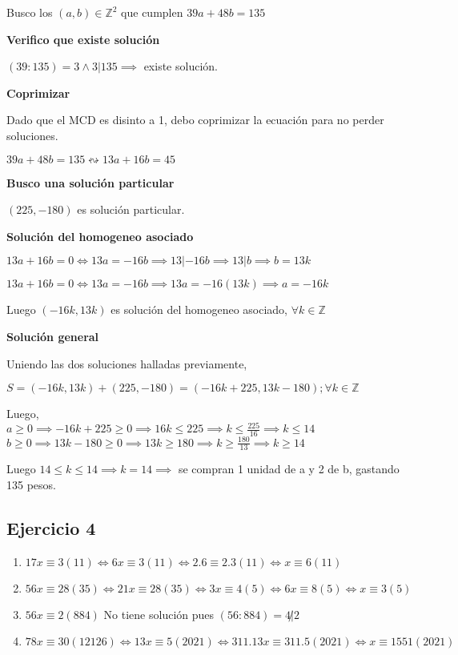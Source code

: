 Busco los $ (a,b) \in \mathbb{Z}^2 $ que cumplen $ 39a+48b=135 $

\textbf{Verifico que existe solución}

$ (39:135) = 3 \wedge 3|135 \implies $ existe solución.

\textbf{Coprimizar}

Dado que el MCD es disinto a 1, debo coprimizar la ecuación para no perder soluciones.

$ 39a+48b=135 \leftrightsquigarrow 13a+16b=45$

\textbf{Busco una solución particular}

$ (225,-180) $ es solución particular.

\textbf{Solución del homogeneo asociado}

$ 13a +16b = 0 \iff 13a = -16b \implies 13|-16b \implies 13|b \implies b=13k $

$ 13a +16b = 0 \iff 13a = -16b \implies 13a = -16(13k) \implies a = -16k $

Luego $ (-16k,13k) $ es solución del homogeneo asociado, $ \forall k \in \mathbb{Z} $

\textbf{Solución general}

Uniendo las dos soluciones halladas previamente,

$ S = (-16k,13k) + (225,-180) = (-16k+225,13k-180); \forall k \in \mathbb{Z} $

Luego, \\
$ a \geq 0 \implies -16k+225 \geq 0 \implies 16k \leq 225 \implies k \leq \frac{225}{16} \implies k \leq 14 $ \\
$ b \geq 0 \implies 13k-180 \geq 0 \implies 13k \geq 180 \implies k \geq \frac{180}{13} \implies k \geq 14 $

Luego $ 14 \leq k \leq 14 \implies k = 14 \implies $ se compran 1 unidad de a y 2 de b, gastando 135 pesos.

\subsection{Ejercicio 4}

\begin{enumerate}
    \item $ 17x \equiv 3(11) \iff 6x \equiv 3(11) \iff 2.6 \equiv 2.3(11) \iff x \equiv 6(11) $
    \item $ 56x \equiv 28(35) \iff 21x \equiv 28(35) \iff 3x \equiv 4(5) \iff 6x \equiv 8(5) \iff x \equiv 3(5) $
    \item $ 56x \equiv 2(884) $ No tiene solución pues $ (56:884) = 4 \not | 2 $
    \item $ 78x \equiv 30(12126) \iff 13x\equiv 5(2021) \iff 311.13x \equiv 311.5(2021) \iff x \equiv 1551(2021) $
\end{enumerate}


